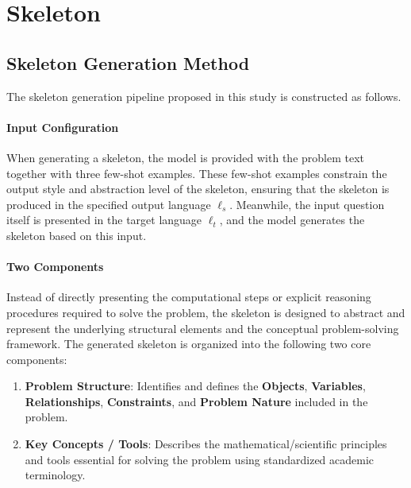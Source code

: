 \appendix
\section{Skeleton}\label{Appendix:about-skeleton}
\subsection{Skeleton Generation Method}
The skeleton generation pipeline proposed in this study is constructed as follows.

\paragraph{Input Configuration}
When generating a skeleton, the model is provided with the problem text together with three few-shot examples. These few-shot examples constrain the output style and abstraction level of the skeleton, ensuring that the skeleton is produced in the specified output language $\ell_s$. Meanwhile, the input question itself is presented in the target language $\ell_t$, and the model generates the skeleton based on this input.

\paragraph{Two Components}
Instead of directly presenting the computational steps or explicit reasoning procedures required to solve the problem, the skeleton is designed to abstract and represent the underlying structural elements and the conceptual problem-solving framework. The generated skeleton is organized into the following two core components:
\begin{enumerate}
    \item \textbf{Problem Structure}: Identifies and defines the \textbf{Objects}, \textbf{Variables}, \textbf{Relationships}, \textbf{Constraints}, and \textbf{Problem Nature} included in the problem.
    \item \textbf{Key Concepts / Tools}: Describes the mathematical/scientific principles and tools essential for solving the problem using standardized academic terminology.
\end{enumerate}

